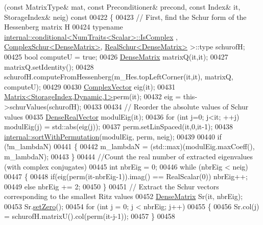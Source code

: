 \begin{DoxyCode}
      (\textcolor{keyword}{const} MatrixType& mat, \textcolor{keyword}{const} Preconditioner& precond, \textcolor{keyword}{const} Index& it, StorageIndex& neig)\textcolor{keyword}{ const}
00422 \textcolor{keyword}{}\{
00423   \textcolor{comment}{// First, find the Schur form of the Hessenberg matrix H}
00424   \textcolor{keyword}{typename} \hyperlink{struct_eigen_1_1internal_1_1conditional}{internal::conditional<NumTraits<Scalar>::IsComplex}
      , \hyperlink{group___eigenvalues___module_class_eigen_1_1_complex_schur}{ComplexSchur<DenseMatrix>}, \hyperlink{group___eigenvalues___module_class_eigen_1_1_real_schur}{RealSchur<DenseMatrix>} >::type 
      schurofH; 
00425   \textcolor{keywordtype}{bool} computeU = \textcolor{keyword}{true};
00426   \hyperlink{group___core___module}{DenseMatrix} matrixQ(it,it); 
00427   matrixQ.setIdentity();
00428   schurofH.computeFromHessenberg(m\_Hes.topLeftCorner(it,it), matrixQ, computeU); 
00429   
00430   \hyperlink{group___core___module_class_eigen_1_1_matrix}{ComplexVector} eig(it);
00431   \hyperlink{group___core___module}{Matrix<StorageIndex,Dynamic,1>}perm(it);
00432   eig = this->schurValues(schurofH);
00433   
00434   \textcolor{comment}{// Reorder the absolute values of Schur values}
00435   \hyperlink{group___core___module}{DenseRealVector} modulEig(it); 
00436   \textcolor{keywordflow}{for} (\textcolor{keywordtype}{int} j=0; j<it; ++j) modulEig(j) = std::abs(eig(j)); 
00437   perm.setLinSpaced(it,0,it-1);
00438   \hyperlink{namespace_eigen_1_1internal_afe2a11c61eff70f7f68681a557fa21e7}{internal::sortWithPermutation}(modulEig, perm, neig);
00439   
00440   \textcolor{keywordflow}{if} (!m\_lambdaN)
00441   \{
00442     m\_lambdaN = (std::max)(modulEig.maxCoeff(), m\_lambdaN);
00443   \}
00444   \textcolor{comment}{//Count the real number of extracted eigenvalues (with complex conjugates)}
00445   \textcolor{keywordtype}{int} nbrEig = 0; 
00446   \textcolor{keywordflow}{while} (nbrEig < neig)
00447   \{
00448     \textcolor{keywordflow}{if}(eig(perm(it-nbrEig-1)).imag() == RealScalar(0)) nbrEig++; 
00449     \textcolor{keywordflow}{else} nbrEig += 2; 
00450   \}
00451   \textcolor{comment}{// Extract the  Schur vectors corresponding to the smallest Ritz values}
00452   \hyperlink{group___core___module}{DenseMatrix} Sr(it, nbrEig); 
00453   Sr.\hyperlink{class_eigen_1_1_plain_object_base_ac21ad5f989f320e46958b75ac8d9a1da}{setZero}();
00454   \textcolor{keywordflow}{for} (\textcolor{keywordtype}{int} j = 0; j < nbrEig; j++)
00455   \{
00456     Sr.col(j) = schurofH.matrixU().col(perm(it-j-1));
00457   \}
00458   

\end{DoxyCode}
